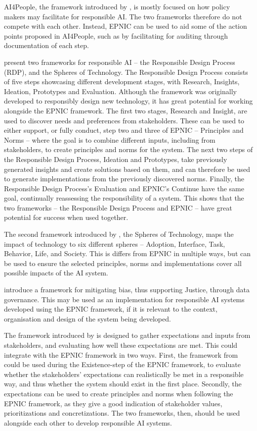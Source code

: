 AI4People, the framework introduced by \textcite{Floridi_2018}, is mostly focused on how policy makers may facilitate for responsible AI. The two frameworks therefore do not compete with each other. Instead, EPNIC can be used to aid some of the action points proposed in AI4People, such as by facilitating for auditing through documentation of each step.

\textcite{Peters_2020} present two frameworks for responsible AI -- the Responsible Design Process (RDP), and the Spheres of Technology. The Responsible Design Process consists of five steps showcasing different development stages, with Research, Insights, Ideation, Prototypes and Evaluation. Although the framework was originally developed to responsibly design new technology, it has great potential for working alongside the EPNIC framework. The first two stages, Research and Insight, are used to discover needs and preferences from stakeholders. These can be used to either support, or fully conduct, step two and three of EPNIC -- Principles and Norms -- where the goal is to combine different inputs, including from stakeholders, to create principles and norms for the system. The next two steps of the Responsible Design Process, Ideation and Prototypes, take previously generated insights and create solutions based on them, and can therefore be used to generate implementations from the previously discovered norms. Finally, the Responsible Design Process's Evaluation and EPNIC's Continue have the same goal, continually reassessing the responsibility of a system. This shows that the two frameworks -- the Responsible Design Process and EPNIC -- have great potential for success when used together.

The second framework introduced by \textcite{Peters_2020}, the Spheres of Technology, maps the impact of technology to six different spheres -- Adoption, Interface, Task, Behavior, Life, and Society. This is differs from EPNIC in multiple ways, but can be used to ensure the selected principles, norms and implementations cover all possible impacts of the AI system.

\textcite{Werder_2022} introduce a framework for mitigating bias, thus supporting Justice, through data governance. This may be used as an implementation for responsible AI systems developed using the EPNIC framework, if it is relevant to the context, organisation and design of the system being developed.

The framework introduced by \textcite{Wright_2018} is designed to gather expectations and inputs from stakeholders, and evaluating how well these expectations are met. This could integrate with the EPNIC framework in two ways. First, the framework from \textcite{Wright_2018} could be used during the Existence-step of the EPNIC framework, to evaluate whether the stakeholders' expectations can realistically be met in a responsible way, and thus whether the system should exist in the first place. Secondly, the expectations can be used to create principles and norms when following the EPNIC framework, as they give a good indication of stakeholder values, prioritizations and concretizations. The two frameworks, then, should be used alongside each other to develop responsible AI systems.

